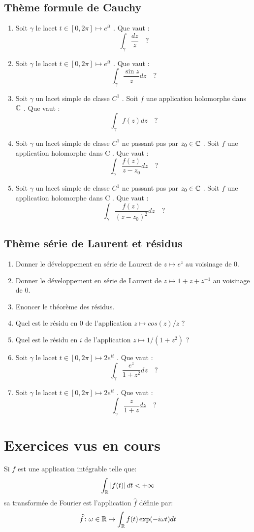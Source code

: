 \documentclass[a4paper, 12pt]{amsart}
\begin{document}
\subsection{Thème formule de Cauchy}
\begin{enumerate}
	\item Soit $\gamma$ le lacet $t \in [0, 2\pi] \mapsto e^{it}$ . Que vaut :
	\[
	\int_\gamma \frac{dz}{z} \quad ?
	\] 
	\item Soit $\gamma$ le lacet $t \in [0, 2\pi] \mapsto e^{it}$ . Que vaut :
	\[
	\int_\gamma \frac{\sin z}{z} dz \quad ?
	\] 
	\item Soit $\gamma$ un lacet simple de classe $C^1$ . Soit $f$ une application holomorphe dans
	$\mathbb{C}$ . Que vaut :
		\[
	\int_\gamma f(z) dz \quad ?
	\] 
	\item Soit  $\gamma$  un lacet simple de classe $C^1$ ne passant pas par $z_0 \in \mathbb{C}$ . Soit $f$ une
	application holomorphe dans C . Que vaut :
	\[
\int_\gamma \frac{f(z)}{z-z_0} dz \quad ?
\] 
		\item Soit  $\gamma$  un lacet simple de classe $C^1$ ne passant pas par $z_0 \in \mathbb{C}$ . Soit $f$ une
	application holomorphe dans C . Que vaut :
	\[
	\int_\gamma \frac{f(z)}{(z-z_0)^2} dz \quad ?
	\] 
\end{enumerate}
\subsection{Thème série de Laurent et résidus}
\begin{enumerate}
	\item Donner le développement en série de Laurent de $z \mapsto e^z$ au voisinage de 0.
	\item Donner le développement en série de Laurent de $z \mapsto 1+z+z^{-1}$ au voisinage de 0.
	\item Enoncer le théorème des résidus.
	\item Quel est le résidu en 0 de l'application $z \mapsto cos(z)/z$ ?
	\item Quel est le résidu en $i$ de l'application $z \mapsto 1/(1 + z^2 )$ ?
	\item Soit $\gamma$ le lacet $t \in [0, 2\pi] \mapsto 2e^{it}$ . Que vaut :
\[
\int_{\gamma} \frac{e^z}{1+z^2}dz\quad ?
\]
	\item Soit $\gamma$ le lacet $t \in [0, 2\pi] \mapsto 2e^{it}$ . Que vaut :
	\[
	\int_{\gamma} \frac{z}{1+z}dz\quad ?
	\]
\end{enumerate}
\section{Exercices vus en cours}
Si $f$ est une application intégrable telle que:
\[
\int_{\mathbb{R}} \left | f(t) \right| dt < +\infty
\]
sa transformée de Fourier est l'application $\widehat{f}$ définie par:
\[
\widehat{f} \colon \omega \in \mathbb{R} \mapsto \int_{\mathbb{R}} f(t) \exp(-i \omega t ) dt
\]
\end{document}
